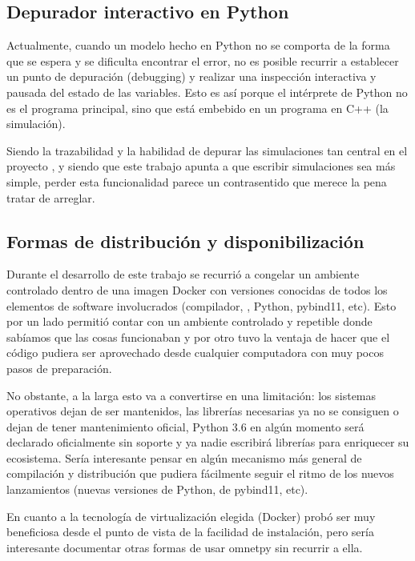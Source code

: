 \subsection{Depurador interactivo en Python}

Actualmente, cuando un modelo hecho en Python no se comporta de la forma que se
espera y se dificulta encontrar el error, no es posible recurrir a establecer
un punto de depuración (debugging) y realizar una inspección interactiva y
pausada del estado de las variables. Esto es así porque el intérprete de Python
no es el programa principal, sino que está embebido en un programa en C++ (la
simulación).

Siendo la trazabilidad y la habilidad de depurar las simulaciones tan central
en el proyecto \omnetpp{}, y siendo que este trabajo apunta a que escribir
simulaciones sea más simple, perder esta funcionalidad parece un contrasentido
que merece la pena tratar de arreglar.

\subsection{Formas de distribución y disponibilización}

Durante el desarrollo de este trabajo se recurrió a congelar un ambiente
controlado dentro de una imagen Docker con versiones conocidas de todos los
elementos de software involucrados (compilador, \omnetpp{}, Python, pybind11,
etc). Esto por un lado permitió contar con un ambiente controlado y repetible
donde sabíamos que las cosas funcionaban y por otro tuvo la ventaja de hacer
que el código pudiera ser aprovechado desde cualquier computadora con muy pocos
pasos de preparación.

No obstante, a la larga esto va a convertirse en una limitación: los sistemas
operativos dejan de ser mantenidos, las librerías necesarias ya no se consiguen
o dejan de tener mantenimiento oficial, Python 3.6 en algún momento será
declarado oficialmente sin soporte y ya nadie escribirá librerías para
enriquecer su ecosistema. Sería interesante pensar en algún mecanismo más
general de compilación y distribución que pudiera fácilmente seguir el ritmo de
los nuevos lanzamientos (nuevas versiones de Python, de pybind11, etc).

En cuanto a la tecnología de virtualización elegida (Docker) probó ser muy
beneficiosa desde el punto de vista de la facilidad de instalación, pero sería
interesante documentar otras formas de usar omnetpy sin recurrir a ella.

